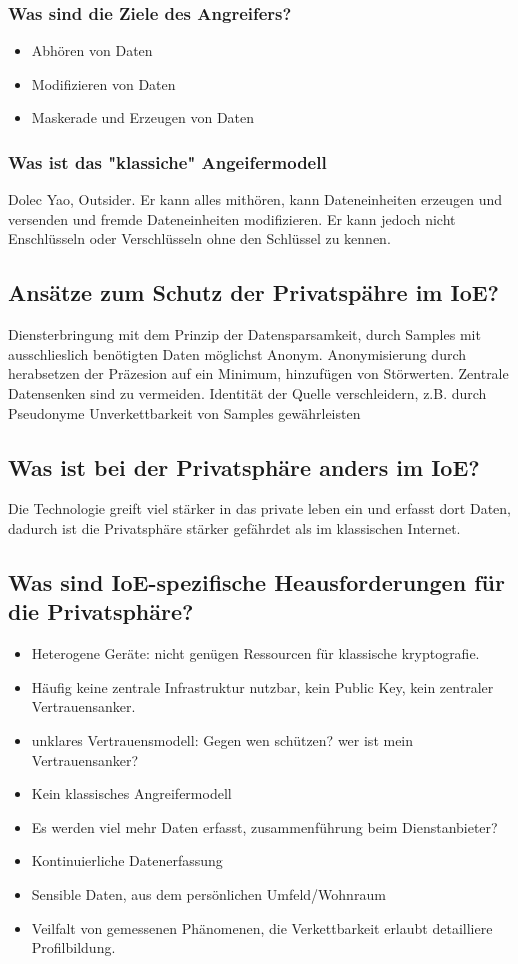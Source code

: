 	\subsubsection{Was sind die Ziele des Angreifers?}
	\begin{itemize}
		\item Abhören von Daten
		\item Modifizieren von Daten
		\item Maskerade und Erzeugen von Daten
	\end{itemize}
	\subsubsection{Was ist das "klassiche" Angeifermodell}
	Dolec\- Yao, Outsider. Er kann alles mithören, kann Dateneinheiten erzeugen und versenden und fremde Dateneinheiten modifizieren. Er kann jedoch nicht Enschlüsseln oder Verschlüsseln ohne den Schlüssel zu kennen.
	
	\subsection{Ansätze zum Schutz der Privatspähre im IoE?}
	Diensterbringung mit dem Prinzip der Datensparsamkeit, durch Samples mit ausschlieslich benötigten Daten möglichst Anonym.
	Anonymisierung durch herabsetzen der Präzesion auf ein Minimum, hinzufügen von Störwerten.
	Zentrale Datensenken sind zu vermeiden. 
	Identität der Quelle verschleidern, z.B. durch Pseudonyme
	Unverkettbarkeit von Samples gewährleisten
	
	\subsection{Was ist bei der Privatsphäre anders im IoE?}
	Die Technologie greift viel stärker in das private leben ein und erfasst dort Daten, dadurch ist die Privatsphäre stärker gefährdet als im klassischen Internet.
	
	\subsection{Was sind IoE-spezifische Heausforderungen für die Privatsphäre?}
	\begin{itemize}
		\item Heterogene Geräte: nicht genügen Ressourcen für klassische kryptografie.
		\item Häufig keine zentrale Infrastruktur nutzbar, kein Public Key, kein zentraler Vertrauensanker.
		\item unklares Vertrauensmodell: Gegen wen schützen? wer ist mein Vertrauensanker?
		\item Kein klassisches Angreifermodell
		\item Es werden viel mehr Daten erfasst, zusammenführung beim Dienstanbieter?
		\item Kontinuierliche Datenerfassung
		\item Sensible Daten, aus dem persönlichen Umfeld/Wohnraum
		\item Veilfalt von gemessenen Phänomenen, die Verkettbarkeit erlaubt detailliere Profilbildung.
	\end{itemize}

